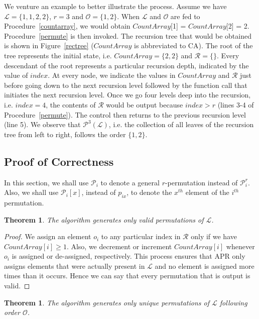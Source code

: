 \documentclass{article}
\newtheorem{theorem}[defn]{Theorem}
\begin{document}
 We venture an example to better illustrate the process. Assume we have $\mathcal{L} = \{1,1,2,2\}$, $r = 3$ and $\mathcal{O}=\{1,2\}$. When $\mathcal{L}$ and $\mathcal{O}$ are fed to Procedure~\ref{countarray}, we would obtain $CountArray$[1] = $CountArray$[2] = 2. Procedure~\ref{permute} is then invoked. The recursion tree that would be obtained is shown in Figure~\ref{rectree} ($CountArray$ is abbreviated to CA). The root of the tree represents the initial state, i.e. $CountArray = \{2,2\}$ and $\mathcal{R}=\{\}$. Every descendant of the root represents a particular recursion depth, indicated by the value of $index$. At every node, we indicate the values in $CountArray$ and $\mathcal{R}$ just before going down to the next recursion level followed by the function call that initiates the next recursion level. Once we go four levels deep into the recursion, i.e. $index=4$, the contents of $\mathcal{R}$ would be output because $index > r$ (lines 3-4 of Procedure~\ref{permute}). The control then returns to the previous recursion level (line 5). We observe that $\mathcal{P}^3(\mathcal{L})$, i.e. the collection of all leaves of the recursion tree from left to right, follows the order $\{1, 2\}$.

\subsection{Proof of Correctness}
\label{subsec:proof}

In this section, we shall use $\mathcal{P}_i$ to denote a general $r$-permutation instead of $\mathcal{P}^r_i$. Also, we shall use $\mathcal{P}_i[x]$, instead of $p_{ix}$, to denote the $x^{th}$ element of the $i^{th}$ permutation.

\begin{theorem}
 The algorithm generates only valid permutations of $\mathcal{L}$.
\end{theorem}

\begin{proof}
 We assign an element $o_i$ to any particular index in $\mathcal{R}$ only if we have $CountArray[i] \ge 1$. Also, we decrement or increment $CountArray[i]$ whenever $o_i$ is assigned or de-assigned, respectively. This process ensures that APR only assigns elements that were actually present in $\mathcal{L}$ and no element is assigned more times than it occurs. Hence we can say that every permutation that is output is valid.\end{proof}

\begin{theorem}
\label{thm:unique_order}
The algorithm generates only unique permutations of $\mathcal{L}$ following order $\mathcal{O}$.
\end{theorem}
\end{document}
